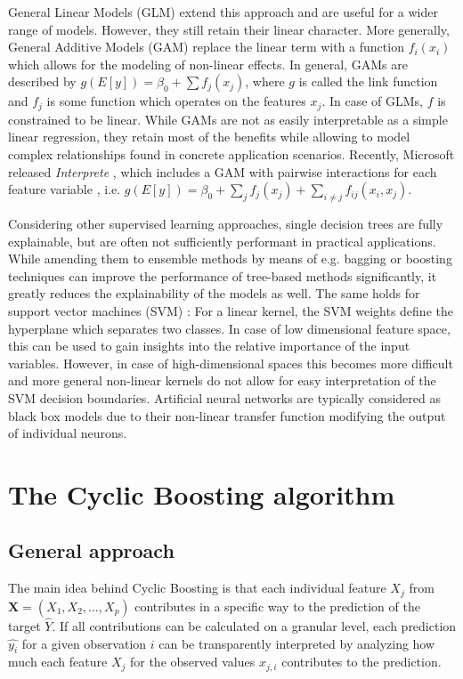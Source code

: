 \documentclass[BCOR=1mm, DIV=calc,10pt,
twoside=true,
twocolumn,
headings=normal]{scrartcl}
\begin{document}
General Linear Models (GLM) \cite{GLM} extend this approach and are useful for a wider
range of models. However, they still retain their linear character. More generally,
General Additive Models (GAM) \cite{GAM} replace the linear term with a function
$f_i(x_i)$ which allows for the modeling of non-linear effects. In general, GAMs are
described by $g(E[y]) = \beta_0 + \sum f_j(x_j)$, where $g$ is called the link function
and $f_j$ is some function which operates on the features $x_j$. In case of GLMs, $f$ is
constrained to be linear. While GAMs are not as easily interpretable as a simple linear
regression, they retain most of the benefits while allowing to model complex relationships
found in concrete application scenarios. Recently, Microsoft released {\em Interprete}
\cite{Interprete}, which includes a GAM with pairwise interactions for each feature
variable \cite{GAM_Microsoft}, i.e.
$g(E[y]) = \beta_0 + \sum_j f_j(x_j) + \sum_{i \ne j} f_{ij}(x_i,x_j)$.

Considering other supervised learning approaches, single decision trees \cite{Breiman2001}
are fully explainable, but are often not sufficiently performant in practical
applications. While amending them to ensemble methods by means of e.g. bagging or boosting
techniques can improve the performance of tree-based methods significantly, it greatly
reduces the explainability of the models as well. The same holds for support vector
machines (SVM) \cite{Boser1992}: For a linear kernel, the SVM weights define the
hyperplane which separates two classes. In case of low dimensional feature space, this can
be used to gain insights into the relative importance of the input variables. However, in
case of high-dimensional spaces this becomes more difficult and more general non-linear
kernels do not allow for easy interpretation of the SVM decision boundaries. Artificial
neural networks are typically considered as black box models due to their non-linear
transfer function modifying the output of individual neurons.


\section{The Cyclic Boosting algorithm}

\subsection{General approach}

The main idea behind Cyclic Boosting is that each individual feature $X_j$ from
$\bm{X} = (X_1, X_2, \ldots , X_p)$ contributes in a specific way to the prediction of the
target $\hat{Y}$. If all contributions can be calculated on a granular level, each
prediction $\hat{y_i}$ for a given observation $i$ can be transparently interpreted by
analyzing how much each feature $X_j$ for the observed values $x_{j,i}$ contributes to the
prediction.
\end{document}
